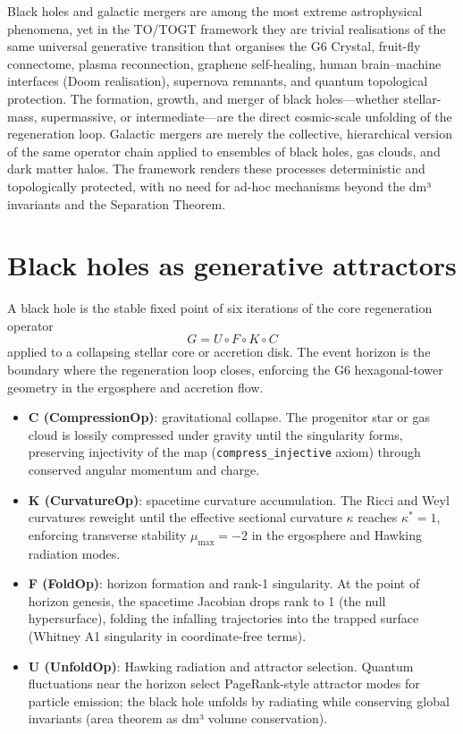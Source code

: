 \documentclass[19pt]{book}
\theoremstyle{plain}
\theoremstyle{definition}
\theoremstyle{remark}
\begin{document}
Black holes and galactic mergers are among the most extreme astrophysical phenomena, yet in the TO/TOGT framework they are trivial realisations of the same universal generative transition that organises the G6 Crystal, fruit-fly connectome, plasma reconnection, graphene self-healing, human brain–machine interfaces (Doom realisation), supernova remnants, and quantum topological protection. The formation, growth, and merger of black holes—whether stellar-mass, supermassive, or intermediate—are the direct cosmic-scale unfolding of the regeneration loop. Galactic mergers are merely the collective, hierarchical version of the same operator chain applied to ensembles of black holes, gas clouds, and dark matter halos. The framework renders these processes deterministic and topologically protected, with no need for ad-hoc mechanisms beyond the dm³ invariants and the Separation Theorem.

\section{Black holes as generative attractors}

A black hole is the stable fixed point of six iterations of the core regeneration operator
\[
G = U \circ F \circ K \circ C
\]
applied to a collapsing stellar core or accretion disk. The event horizon is the boundary where the regeneration loop closes, enforcing the G6 hexagonal-tower geometry in the ergosphere and accretion flow.

\begin{itemize}
\item \textbf{C (CompressionOp)}: gravitational collapse. The progenitor star or gas cloud is lossily compressed under gravity until the singularity forms, preserving injectivity of the map (\texttt{compress\_injective} axiom) through conserved angular momentum and charge.
\item \textbf{K (CurvatureOp)}: spacetime curvature accumulation. The Ricci and Weyl curvatures reweight until the effective sectional curvature \(\kappa\) reaches \(\kappa^* = 1\), enforcing transverse stability \(\mu_{\max} = -2\) in the ergosphere and Hawking radiation modes.
\item \textbf{F (FoldOp)}: horizon formation and rank-1 singularity. At the point of horizon genesis, the spacetime Jacobian drops rank to 1 (the null hypersurface), folding the infalling trajectories into the trapped surface (Whitney A1 singularity in coordinate-free terms).
\item \textbf{U (UnfoldOp)}: Hawking radiation and attractor selection. Quantum fluctuations near the horizon select PageRank-style attractor modes for particle emission; the black hole unfolds by radiating while conserving global invariants (area theorem as dm³ volume conservation).
\end{itemize}
\end{document}
